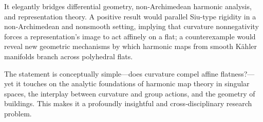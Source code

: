 It elegantly bridges differential geometry, non‑Archimedean harmonic analysis, and representation theory. A positive result would parallel Siu-type rigidity in a non‑Archimedean and nonsmooth setting, implying that curvature nonnegativity forces a representation’s image to act affinely on a flat; a counterexample would reveal new geometric mechanisms by which harmonic maps from smooth Kähler manifolds branch across polyhedral flats.  

The statement is conceptually simple—does curvature compel affine flatness?—yet it touches on the analytic foundations of harmonic map theory in singular spaces, the interplay between curvature and group actions, and the geometry of buildings. This makes it a profoundly insightful and cross‑disciplinary research problem.